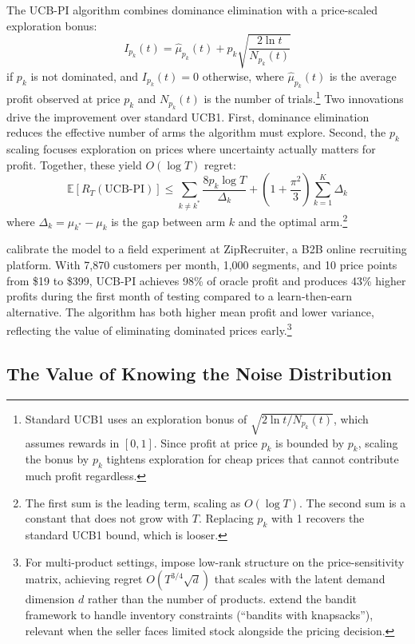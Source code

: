 The UCB-PI algorithm combines dominance elimination with a price-scaled exploration bonus:
\begin{equation}
\label{eq:ucbpi}
I_{p_k}(t) = \hat{\mu}_{p_k}(t) + p_k \sqrt{\frac{2 \ln t}{N_{p_k}(t)}}
\end{equation}
if $p_k$ is not dominated, and $I_{p_k}(t) = 0$ otherwise, where $\hat{\mu}_{p_k}(t)$ is the average profit observed at price $p_k$ and $N_{p_k}(t)$ is the number of trials.\footnote{Standard UCB1 uses an exploration bonus of $\sqrt{2\ln t / N_{p_k}(t)}$, which assumes rewards in $[0,1]$. Since profit at price $p_k$ is bounded by $p_k$, scaling the bonus by $p_k$ tightens exploration for cheap prices that cannot contribute much profit regardless.} Two innovations drive the improvement over standard UCB1. First, dominance elimination reduces the effective number of arms the algorithm must explore. Second, the $p_k$ scaling focuses exploration on prices where uncertainty actually matters for profit. Together, these yield $O(\log T)$ regret:
\begin{equation}
\mathbb{E}[R_T(\text{UCB-PI})] \leq \sum_{k \neq k^*} \frac{8 p_k \log T}{\Delta_k} + \left(1 + \frac{\pi^2}{3}\right) \sum_{k=1}^K \Delta_k
\end{equation}
where $\Delta_k = \mu_{k^*} - \mu_k$ is the gap between arm $k$ and the optimal arm.\footnote{The first sum is the leading term, scaling as $O(\log T)$. The second sum is a constant that does not grow with $T$. Replacing $p_k$ with 1 recovers the standard UCB1 bound, which is looser.}

\citet{Misra2019} calibrate the model to a field experiment at ZipRecruiter, a B2B online recruiting platform. With 7,870 customers per month, 1,000 segments, and 10 price points from \$19 to \$399, UCB-PI achieves 98\% of oracle profit and produces 43\% higher profits during the first month of testing compared to a learn-then-earn alternative. The algorithm has both higher mean profit and lower variance, reflecting the value of eliminating dominated prices early.\footnote{For multi-product settings, \citet{Mueller2019} impose low-rank structure on the price-sensitivity matrix, achieving regret $O(T^{3/4}\sqrt{d})$ that scales with the latent demand dimension $d$ rather than the number of products. \citet{Badanidiyuru2013} extend the bandit framework to handle inventory constraints (``bandits with knapsacks''), relevant when the seller faces limited stock alongside the pricing decision.}

\subsection{The Value of Knowing the Noise Distribution}
\label{sec:xu}

